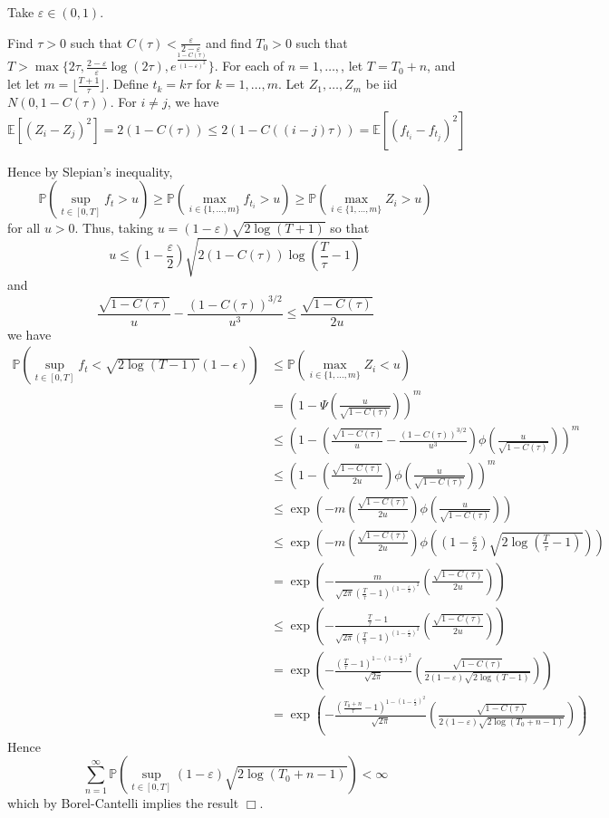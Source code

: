 \documentclass[11pt]{article}
\begin{document}
Take $\varepsilon \in (0,1)$.

Find $\tau > 0$ such that $C(\tau) <
\frac{\varepsilon}{2-\varepsilon}$ and find $T_0 > 0$ such that $T > \max\{ 2\tau,\frac{2-\varepsilon}{\varepsilon} \log(2\tau), e^{\frac{1-C(\tau)}{(1-\varepsilon)^2}}\}$.  For each of $n =
1,\hdots,$, let $T = T_0 + n$, and let let $m = \lfloor
\frac{T+1}{\tau} \rfloor$.  Define $t_k = k\tau$ for $k = 1,\hdots,m$.
Let $Z_1,\hdots, Z_m$ be iid $N(0,1-C(\tau))$.  For $i \neq j$, we have
\[
\mathbb{E}[(Z_i - Z_j)^2] = 2(1-C(\tau)) \leq 2(1-C((i-j)\tau)) = \mathbb{E}[(f_{t_i}-f_{t_j})^2]
\]

Hence by Slepian's inequality,
\[
\mathbb{P}(\sup_{t \in [0,T]} f_t > u) \geq
\mathbb{P}(\max_{i \in \{1,\hdots,m\}} f_{t_i} > u) \geq
\mathbb{P}(\max_{i \in \{1,\hdots,m\}} Z_i > u)\]
for all $u > 0$.
Thus, taking $u = (1-\varepsilon)\sqrt{2\log(T+1)}$
so that
\[
u \leq 
\left(1-\frac{\varepsilon}{2}\right) \sqrt{2(1-C(\tau)) \log\left(\frac{T}{\tau}-1\right)}
\]
and
\[
\frac{\sqrt{1-C(\tau)}}{u} - \frac{(1-C(\tau))^{3/2}}{u^3} \leq \frac{\sqrt{1-C(\tau)}}{2u}
\]
we have
\begin{align}
\mathbb{P}(\sup_{t \in [0,T]} f_t < \sqrt{2\log (T-1)}(1-\epsilon))
&\leq \mathbb{P}(\max_{i \in \{1,\hdots,m\}} Z_i < u)
\\&= \left(1-\Psi\left(\frac{u}{\sqrt{1-C(\tau)}}\right)\right)^m
\\&\leq \left(1-\left(\frac{\sqrt{1-C(\tau)}}{u} - \frac{(1-C(\tau))^{3/2}}{u^3}\right)\phi\left(\frac{u}{\sqrt{1-C(\tau)}}\right)\right)^m
\\&\leq \left(1-\left(\frac{\sqrt{1-C(\tau)}}{2u}\right)\phi\left(\frac{u}{\sqrt{1-C(\tau)}}\right)\right)^m
\\& \leq \exp\left(-m\left(\frac{\sqrt{1-C(\tau)}}{2u}\right)\phi\left(\frac{u}{\sqrt{1-C(\tau)}}\right)\right) 
\\& \leq \exp\left(-m\left(\frac{\sqrt{1-C(\tau)}}{2u}\right)\phi\left(\left(1-\frac{\varepsilon}{2}\right)\sqrt{2 \log\left(\frac{T}{\tau}-1\right)}\right)\right) 
\\& = \exp\left(-\frac{m}{\sqrt{2\pi}\left(\frac{T}{\tau}-1\right)^{(1-\frac{\varepsilon}{2})^2}}\left(\frac{\sqrt{1-C(\tau)}}{2u}\right)\right)
\\& \leq \exp\left(-\frac{\frac{T}{\tau}-1}{\sqrt{2\pi}\left(\frac{T}{\tau}-1\right)^{(1-\frac{\varepsilon}{2})^2}}\left(\frac{\sqrt{1-C(\tau)}}{2u}\right)\right)
\\& = \exp\left(-\frac{\left(\frac{T}{\tau}-1\right)^{1-(1-\frac{\varepsilon}{2})^2}}{\sqrt{2\pi}}\left(\frac{\sqrt{1-C(\tau)}}{2(1-\varepsilon)\sqrt{2\log(T-1)}}\right)\right)
\\& = \exp\left(-\frac{\left(\frac{T_0 + n}{\tau}-1\right)^{1-(1-\frac{\varepsilon}{2})^2}}{\sqrt{2\pi}}\left(\frac{\sqrt{1-C(\tau)}}{2(1-\varepsilon)\sqrt{2\log(T_0+n-1)}}\right)\right)
\end{align}
Hence
\begin{equation}\label{bcres1}
\sum_{n=1}^\infty \mathbb{P}(\sup_{t \in [0,T]} (1-\varepsilon)\sqrt{2\log(T_0+n-1)}) < \infty
\end{equation}
which by Borel-Cantelli implies the result $\Box$.
\end{document}
